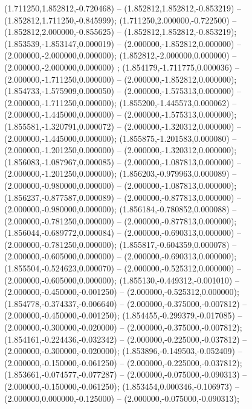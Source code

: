  (1.711250,1.852812,-0.720468) -- (1.852812,1.852812,-0.853219) -- (1.852812,1.711250,-0.845999);
 (1.711250,2.000000,-0.722500) -- (1.852812,2.000000,-0.855625) -- (1.852812,1.852812,-0.853219);
 (1.853539,-1.853147,0.000019) -- (2.000000,-1.852812,0.000000) -- (2.000000,-2.000000,0.000000);
 (1.852812,-2.000000,0.000000) -- (2.000000,-2.000000,0.000000) ;
 (1.854179,-1.711775,0.000036) -- (2.000000,-1.711250,0.000000) -- (2.000000,-1.852812,0.000000);
 (1.854733,-1.575909,0.000050) -- (2.000000,-1.575313,0.000000) -- (2.000000,-1.711250,0.000000);
 (1.855200,-1.445573,0.000062) -- (2.000000,-1.445000,0.000000) -- (2.000000,-1.575313,0.000000);
 (1.855581,-1.320791,0.000072) -- (2.000000,-1.320312,0.000000) -- (2.000000,-1.445000,0.000000);
 (1.855875,-1.201583,0.000080) -- (2.000000,-1.201250,0.000000) -- (2.000000,-1.320312,0.000000);
 (1.856083,-1.087967,0.000085) -- (2.000000,-1.087813,0.000000) -- (2.000000,-1.201250,0.000000);
 (1.856203,-0.979963,0.000089) -- (2.000000,-0.980000,0.000000) -- (2.000000,-1.087813,0.000000);
 (1.856237,-0.877587,0.000089) -- (2.000000,-0.877813,0.000000) -- (2.000000,-0.980000,0.000000);
 (1.856184,-0.780852,0.000088) -- (2.000000,-0.781250,0.000000) -- (2.000000,-0.877813,0.000000);
 (1.856044,-0.689772,0.000084) -- (2.000000,-0.690313,0.000000) -- (2.000000,-0.781250,0.000000);
 (1.855817,-0.604359,0.000078) -- (2.000000,-0.605000,0.000000) -- (2.000000,-0.690313,0.000000);
 (1.855504,-0.524623,0.000070) -- (2.000000,-0.525312,0.000000) -- (2.000000,-0.605000,0.000000);
 (1.855130,-0.449312,-0.001010) -- (2.000000,-0.450000,-0.001250) -- (2.000000,-0.525312,0.000000);
 (1.854778,-0.374337,-0.006640) -- (2.000000,-0.375000,-0.007812) -- (2.000000,-0.450000,-0.001250);
 (1.854455,-0.299379,-0.017085) -- (2.000000,-0.300000,-0.020000) -- (2.000000,-0.375000,-0.007812);
 (1.854161,-0.224436,-0.032342) -- (2.000000,-0.225000,-0.037812) -- (2.000000,-0.300000,-0.020000);
 (1.853896,-0.149503,-0.052409) -- (2.000000,-0.150000,-0.061250) -- (2.000000,-0.225000,-0.037812);
 (1.853661,-0.074577,-0.077287) -- (2.000000,-0.075000,-0.090313) -- (2.000000,-0.150000,-0.061250);
 (1.853454,0.000346,-0.106973) -- (2.000000,0.000000,-0.125000) -- (2.000000,-0.075000,-0.090313);
